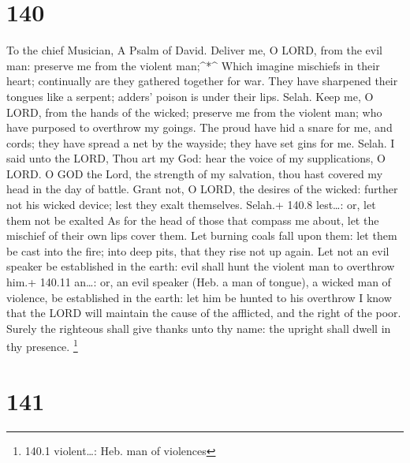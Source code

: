 \hypertarget{section-140}{%
\section{140}\label{section-140}}

To the chief Musician, A Psalm of David.  Deliver me, O
LORD, from the evil man: preserve me from the violent man;\^{}*\^{}
 Which imagine mischiefs in their heart; continually are
they gathered together for war.  They have sharpened their
tongues like a serpent; adders' poison is under their lips. Selah.
 Keep me, O LORD, from the hands of the wicked; preserve me
from the violent man; who have purposed to overthrow my goings.
 The proud have hid a snare for me, and cords; they have
spread a net by the wayside; they have set gins for me. Selah.
 I said unto the LORD, Thou art my God: hear the voice of my
supplications, O LORD.  O GOD the Lord, the strength of my
salvation, thou hast covered my head in the day of battle. 
Grant not, O LORD, the desires of the wicked: further not his wicked
device; lest they exalt themselves. Selah.+ 140.8 lest\ldots: or, let
them not be exalted  As for the head of those that compass
me about, let the mischief of their own lips cover them. 
Let burning coals fall upon them: let them be cast into the fire; into
deep pits, that they rise not up again.  Let not an evil
speaker be established in the earth: evil shall hunt the violent man to
overthrow him.+ 140.11 an\ldots: or, an evil speaker (Heb. a man of
tongue), a wicked man of violence, be established in the earth: let him
be hunted to his overthrow  I know that the LORD will
maintain the cause of the afflicted, and the right of the poor.
 Surely the righteous shall give thanks unto thy name: the
upright shall dwell in thy presence. \footnote{140.1 violent\ldots: Heb.
  man of violences}

\hypertarget{section-141}{%
\section{141}\label{section-141}}

